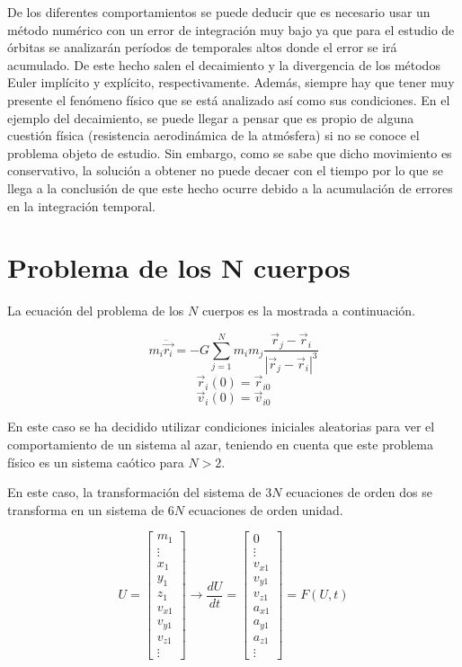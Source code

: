 \documentclass{article}
\begin{document}
	De los diferentes comportamientos se puede deducir que es necesario usar un método numérico con un error de integración muy bajo ya que para el estudio de órbitas se analizarán períodos de temporales altos donde el error se irá acumulado. De este hecho salen el decaimiento y la divergencia de los métodos Euler implícito y explícito, respectivamente. Además, siempre hay que tener muy presente el fenómeno físico que se está analizado así como sus condiciones. En el ejemplo del decaimiento, se puede llegar a pensar que es propio de alguna cuestión física (resistencia aerodinámica de la atmósfera) si no se conoce el problema objeto de estudio. Sin embargo, como se sabe que dicho movimiento es conservativo, la solución a obtener no puede decaer con el tiempo por lo que se llega a la conclusión de que este hecho ocurre debido a la acumulación de errores en la integración temporal.
	
	\section{Problema de los N cuerpos}
	
	La ecuación del problema de los $N$ cuerpos es la mostrada a continuación.
	
	$$m_i \ddot{\vec{r_i}}=-G\sum_{j=1}^{N}m_im_j\frac{\vec{r}_j-\vec{r}_i}{|\vec{r}_j-\vec{r}_i|^3}$$
	$$\vec{r}_i(0)=\vec{r}_{i0}$$
	$$\vec{v}_i(0)=\vec{v}_{i0}$$
	
	En este caso se ha decidido utilizar condiciones iniciales aleatorias para ver el comportamiento de un sistema al azar, teniendo en cuenta que este problema físico es un sistema caótico para $N>2$.
	
	En este caso, la transformación del sistema de $3N$ ecuaciones de orden dos se transforma en un sistema de $6N$ ecuaciones de orden unidad.
	
	\[
	U=\left[\begin{array}{c}
	m_{1}\\
	\vdots\\
	x_{1}\\
	y_{1}\\
	z_{1}\\
	v_{x1}\\
	v_{y1}\\
	v_{z1}\\
	\vdots
	\end{array}\right]\rightarrow\frac{dU}{dt}=\left[\begin{array}{c}
	0\\
	\vdots\\
	v_{x1}\\
	v_{y1}\\
	v_{z1}\\
	a_{x1}\\
	a_{y1}\\
	a_{z1}\\
	\vdots
	\end{array}\right]=F(U,t)
	\]
	
\end{document}
